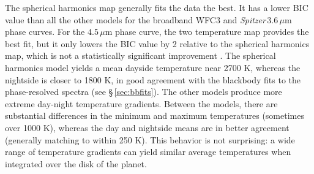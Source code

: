 \documentclass[twocolumn]{aastex61}
\newcommand{\project}[1]{\textsl{#1}}
\newcommand{\Spitzer}{\project{Spitzer}}
\begin{document}
The spherical harmonics map generally fits the data the best. It has a lower BIC value than all the other models for the broadband WFC3 and \Spitzer\,$3.6\,\mu$m phase curves. For the $4.5\,\mu$m phase curve, the two temperature map provides the best fit, but it only lowers the BIC value by 2 relative to the spherical harmonics map, which is not a statistically significant improvement \citep{kass95}.  The spherical harmonics model yields a mean dayside temperature near 2700 K, whereas the nightside is closer to 1800 K, in good agreement with the blackbody fits to the phase-resolved spectra (see \S\,\ref{sec:bbfits}).  The other models produce more extreme day-night temperature gradients.  Between the models, there are substantial differences in the minimum and maximum temperatures (sometimes over 1000 K), whereas the day and nightside means are in better agreement (generally matching to within 250 K). This behavior is not surprising: a wide range of temperature gradients can yield similar average temperatures when integrated over the disk of the planet.  


\end{document}
